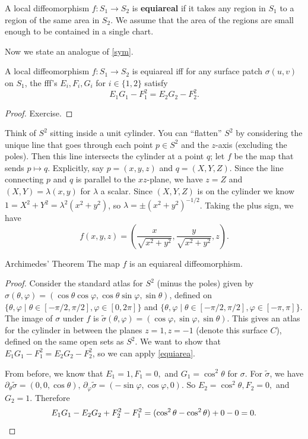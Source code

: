 \begin{definition}[]
    A local diffeomorphism $f \colon S_1 \to S_2$ is \textbf{equiareal} if it takes any region in $S_1$ to a region of the same area in $S_2$. We assume that the area of the regions are small enough to be contained in a single chart.
\end{definition}
Now we state an analogue of \cref{sym}.
\begin{theorem}\label{equiarea} 
    A local diffeomorphism $f \colon S_1 \to S_2$ is equiareal iff for any surface patch $\sigma(u,v)$ on $S_1$, the fff's $E_i ,F_i ,G_i $ for $i \in \{1,2\} $ satisfy \[
    E_1G_1-F_1^2=E_2G_2-F_2^2.
    \] 
\end{theorem}
\begin{proof}
    Exercise.
\end{proof}
Think of $S^2$ sitting inside a unit cylinder. You can ``flatten'' $S^2$ by considering the unique line that goes through each point $p \in S^2$ and the $z$-axis (excluding the poles). Then this line intersects the cylinder at a point $q$; let $f$ be the map that sends $p \mapsto q$. Explicitly, say $p=(x,y,z)$ and $q=(X,Y,Z)$. Since the line connecting $p$ and $q$ is parallel to the $xz$-plane, we have $z=Z$ and $(X,Y)=\lambda (x,y)$ for $\lambda$ a scalar. Since $(X,Y,Z)$ is on the cylinder we know $1=X^2+Y^2=\lambda^2 (x^2+y^2)$, so $\lambda=\pm (x^2+y^2)^{- 1/2}$. Taking the plus sign, we have \[
    f(x,y,z)=\left( \frac{x}{\sqrt{x^2+y^2} }, \frac{y}{\sqrt{x^2+y^2} } ,z\right) .
\] 
\begin{namedthm}{Archimedes' Theorem} 
   The map $f$ is an equiareal diffeomorphism. 
\end{namedthm}
\begin{proof}
    Consider the standard atlas for $S^2$ (minus the poles) given by $\sigma(\theta,\varphi )=(\cos \theta \cos \varphi , \cos \theta \sin \varphi , \sin \theta)$, defined on $\{\theta,\varphi \mid \theta \in [-\pi /2,\pi /2],\varphi  \in [0,2\pi]\} $ and $\{\theta,\varphi \mid \theta \in [-\pi /2, \pi /2],\varphi \in [-\pi,\pi]\} $. The image of $\sigma$ under $f$ is $\widetilde \sigma(\theta, \varphi )=(\cos \varphi , \sin \varphi ,\sin \theta)$. This gives an atlas for the cylinder in between the planes $z=1,z=-1$ (denote this surface $C$), defined on the same open sets as $S^2$. We want to show that $E_1G_1-F_1^2=E_2G_2-F_2^2$, so we can apply \cref{equiarea}.

    From before, we know that $E_1=1,F_1=0,$ and $G_1=\cos ^2 \theta$ for $\sigma$. For $\widetilde \sigma$, we have $\partial _{\theta}\widetilde \sigma=(0,0,\cos \theta),\, \partial _{\varphi }\widetilde \sigma=(-\sin \varphi ,\cos \varphi ,0).$ So $E_2=\cos ^2 \theta,F_2=0,$ and $G_2=1$. Therefore\[
        E_1G_1-E_2G_2+F_2^2-F_1^2=(\cos ^2 \theta-\cos ^2 \theta)+0-0=0.\qedhere
    \] 
\end{proof}
